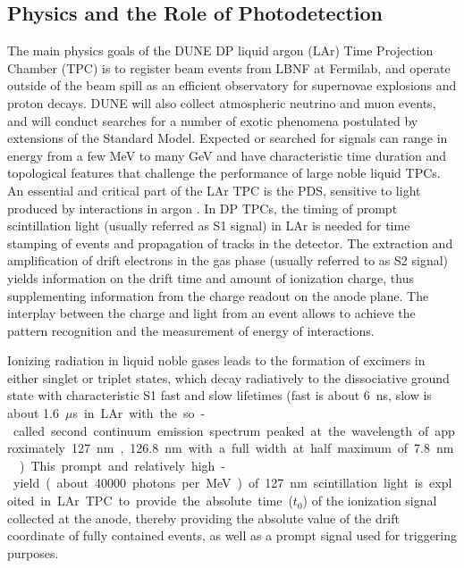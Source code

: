 \subsection{Physics and the Role of Photodetection}
\label{sec:fddp-pd-1.2}

The main physics goals of the DUNE DP liquid argon (LAr) Time Projection Chamber (TPC) is to register beam events from LBNF at Fermilab, and operate outside of the beam spill as an efficient observatory for supernovae explosions and proton decays. DUNE will also collect atmospheric neutrino and muon events, and will conduct searches for a number of exotic phenomena postulated by extensions of the Standard Model.  Expected or searched for signals can range in energy from a few MeV to many GeV and have characteristic time duration and topological features that challenge the performance of large noble liquid TPCs. An essential and critical part of the LAr TPC is the PDS, sensitive to light produced by interactions in argon \cite{Cuesta:2017nrs}. In DP TPCs, the timing of prompt scintillation light (usually referred as S1 signal) in LAr is needed for time stamping of events and propagation of tracks in the detector. The extraction and amplification of drift electrons in the gas phase (usually referred to as S2 signal) yields information on the drift time and amount of ionization charge, thus supplementing information from the charge readout on the anode plane. The interplay between the charge and light from an event allows to achieve the pattern recognition and the measurement of energy of interactions.

Ionizing radiation in liquid noble gases leads to the formation of excimers in either singlet or triplet states, which decay radiatively to the dissociative ground state with characteristic S1 fast and slow lifetimes (fast is about \SI{6}{ns}, slow is about \SI{1.6}{$\mu$s} in LAr with the so-called second continuum emission spectrum peaked at the wavelength of approximately \SI{127}{nm}, \SI{126.8}{nm} with a full width at half maximum of \SI{7.8}{nm} \cite{Heindl}). This prompt and relatively high-yield (about \num{40000} photons per MeV) of \SI{127}{nm} scintillation light is exploited in LAr TPC to provide the absolute time ($t_0$) of the ionization signal collected at the anode, thereby providing the absolute value of the drift coordinate of fully contained events, as well as a prompt signal used for triggering purposes.


